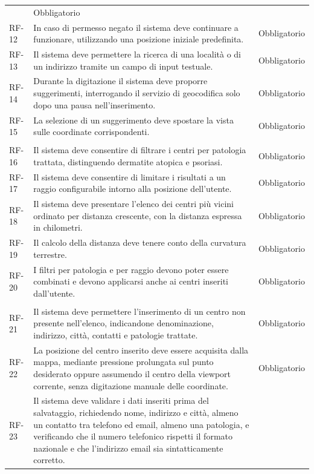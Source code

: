 \begin{longtable}{@{}P{1.4cm} P{9.1cm} P{2.3cm}@{}}
& Obbligatorio \tabularnewline
RF-12 & In caso di permesso negato il sistema deve continuare a funzionare, utilizzando una posizione iniziale predefinita.
& Obbligatorio \tabularnewline
RF-13 & Il sistema deve permettere la ricerca di una località o di un indirizzo tramite un campo di input testuale.
& Obbligatorio \tabularnewline
RF-14 & Durante la digitazione il sistema deve proporre suggerimenti, interrogando il servizio di geocodifica solo dopo una pausa nell'inserimento.
& Obbligatorio \tabularnewline
RF-15 & La selezione di un suggerimento deve spostare la vista sulle coordinate corrispondenti.
& Obbligatorio \tabularnewline
\addlinespace
{} \tabularnewline
RF-16 & Il sistema deve consentire di filtrare i centri per patologia trattata, distinguendo dermatite atopica e psoriasi.
& Obbligatorio \tabularnewline
RF-17 & Il sistema deve consentire di limitare i risultati a un raggio configurabile intorno alla posizione dell'utente.
& Obbligatorio \tabularnewline
RF-18 & Il sistema deve presentare l'elenco dei centri più vicini ordinato per distanza crescente, con la distanza espressa in chilometri.
& Obbligatorio \tabularnewline
RF-19 & Il calcolo della distanza deve tenere conto della curvatura terrestre.
& Obbligatorio \tabularnewline
RF-20 & I filtri per patologia e per raggio devono poter essere combinati e devono applicarsi anche ai centri inseriti dall'utente.
& Obbligatorio \tabularnewline
\addlinespace
{} \tabularnewline
RF-21 & Il sistema deve permettere l'inserimento di un centro non presente nell'elenco, indicandone denominazione, indirizzo,
città, contatti e patologie trattate.
& Obbligatorio \tabularnewline
RF-22 & La posizione del centro inserito deve essere acquisita dalla mappa, mediante pressione prolungata sul punto desiderato oppure
assumendo il centro della viewport corrente, senza digitazione manuale delle coordinate.
& Obbligatorio \tabularnewline
RF-23 & Il sistema deve validare i dati inseriti prima del salvataggio, richiedendo nome, indirizzo e città, almeno un
contatto tra telefono ed email, almeno una patologia, e verificando che il numero telefonico rispetti il formato nazionale e che l'indirizzo
email sia sintatticamente corretto.

\end{longtable}
